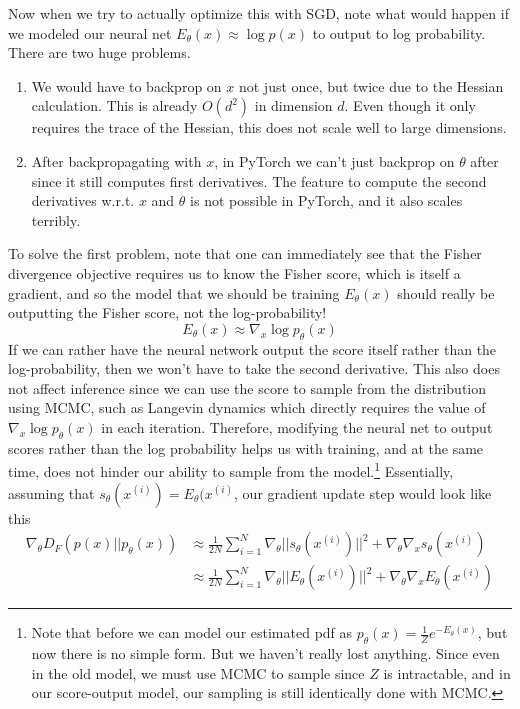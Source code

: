     Now when we try to actually optimize this with SGD, note what would happen if we modeled our neural net $E_\theta(x) \approx \log p(x)$ to output to log probability. There are two huge problems. 
    \begin{enumerate}
      \item We would have to backprop on $x$ not just once, but twice due to the Hessian calculation. This is already $O(d^2)$ in dimension $d$. Even though it only requires the trace of the Hessian, this does not scale well to large dimensions. 
      \item After backpropagating with $x$, in PyTorch we can't just backprop on $\theta$ after since it still computes first derivatives. The feature to compute the second derivatives w.r.t. $x$ and $\theta$ is not possible in PyTorch, and it also scales terribly. 
    \end{enumerate} 
    To solve the first problem, note that one can immediately see that the Fisher divergence objective requires us to know the Fisher score, which is itself a gradient, and so the model that we should be training $E_\theta (x)$ should really be outputting the Fisher score, not the log-probability! 
    \begin{equation}
      E_\theta (x) \approx \nabla_x \log p_\theta (x)
    \end{equation} 
    If we can rather have the neural network output the score itself rather than the log-probability, then we won't have to take the second derivative. This also does not affect inference since we can use the score to sample from the distribution using MCMC, such as Langevin dynamics which directly requires the value of $\nabla_x \log p_\theta (x)$ in each iteration. Therefore, modifying the neural net to output scores rather than the log probability helps us with training, and at the same time, does not hinder our ability to sample from the model.\footnote{Note that before we can model our estimated pdf as $p_\theta (x) = \frac{1}{Z} e^{-E_\theta (x)}$, but now there is no simple form. But we haven't really lost anything. Since even in the old model, we must use MCMC to sample since $Z$ is intractable, and in our score-output model, our sampling is still identically done with MCMC.} Essentially, assuming that $s_\theta (x^{(i)}) = E_\theta (x^{(i)}$, our gradient update step would look like this
    \begin{align}
      \nabla_\theta  D_F (p(x) || p_\theta (x)) & \approx \frac{1}{2N} \sum_{i=1}^N \nabla_\theta || s_\theta (x^{(i)}) ||^2 + \nabla_\theta \nabla_x s_\theta (x^{(i)}) \\ 
                                                & \approx \frac{1}{2N} \sum_{i=1}^N \nabla_\theta || E_\theta (x^{(i)}) ||^2 + \nabla_\theta \nabla_x E_\theta (x^{(i)})
    \end{align}

